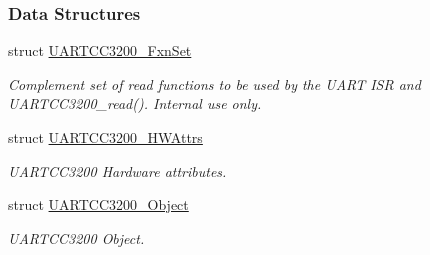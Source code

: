 \subsubsection*{Data Structures}
\begin{DoxyCompactItemize}
\item 
struct \hyperlink{struct_u_a_r_t_c_c3200___fxn_set}{U\+A\+R\+T\+C\+C3200\+\_\+\+Fxn\+Set}
\begin{DoxyCompactList}\small\item\em Complement set of read functions to be used by the U\+A\+R\+T I\+S\+R and U\+A\+R\+T\+C\+C3200\+\_\+read(). Internal use only. \end{DoxyCompactList}\item 
struct \hyperlink{struct_u_a_r_t_c_c3200___h_w_attrs}{U\+A\+R\+T\+C\+C3200\+\_\+\+H\+W\+Attrs}
\begin{DoxyCompactList}\small\item\em U\+A\+R\+T\+C\+C3200 Hardware attributes. \end{DoxyCompactList}\item 
struct \hyperlink{struct_u_a_r_t_c_c3200___object}{U\+A\+R\+T\+C\+C3200\+\_\+\+Object}
\begin{DoxyCompactList}\small\item\em U\+A\+R\+T\+C\+C3200 Object. \end{DoxyCompactList}\end{DoxyCompactItemize}
